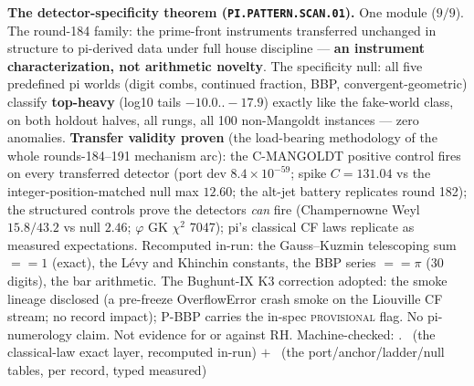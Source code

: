 \par\smallskip\noindent\textbf{The detector-specificity theorem
(\texttt{PI.\allowbreak PATTERN.\allowbreak SCAN.01}).}
One module ($9/9$).  The round-184 family: the prime-front
instruments transferred unchanged in structure to pi-derived data
under full house discipline --- \textbf{an instrument
characterization, not arithmetic novelty}.  The specificity null:
all five predefined pi worlds (digit combs, continued fraction,
BBP, convergent-geometric) classify \textbf{top-heavy} (log10
tails $-10.0..-17.9$) exactly like the fake-world class, on both
holdout halves, all rungs, all 100 non-Mangoldt instances ---
zero anomalies.  \textbf{Transfer validity proven} (the
load-bearing methodology of the whole rounds-184--191 mechanism
arc): the C-MANGOLDT positive control fires on every transferred
detector (port dev $8.4\times10^{-59}$; spike $C = 131.04$ vs the
integer-position-matched null max $12.60$; the alt-jet battery
replicates round 182); the structured controls prove the
detectors \emph{can} fire (Champernowne Weyl $15.8/43.2$ vs null
$2.46$; $\varphi$ GK $\chi^2$ 7047); pi's classical CF laws
replicate as measured expectations.  Recomputed in-run: the
Gauss--Kuzmin telescoping sum $== 1$ (exact), the L\'evy and
Khinchin constants, the BBP series $== \pi$ (30 digits), the bar
arithmetic.  The Bughunt-IX K3 correction adopted: the smoke
lineage disclosed (a pre-freeze OverflowError crash smoke on the
Liouville CF stream; no record impact); P-BBP carries the in-spec
\textsc{provisional} flag.  No pi-numerology claim.  Not evidence
for or against RH.
Machine-checked: .
\mE\ (the classical-law exact layer, recomputed in-run) $+$ \mC\
(the port/anchor/ladder/null tables, per record, typed measured)
\par\smallskip


